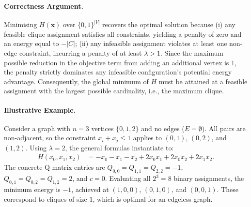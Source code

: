 \documentclass[12pt]{article}
\begin{document}
\paragraph{Correctness Argument.}
Minimising $H(\mathbf{x})$ over $\{0, 1\}^{|V|}$ recovers the optimal solution because (i) any feasible clique assignment satisfies all constraints, yielding a penalty of zero and an energy equal to $-|C|$; (ii) any infeasible assignment violates at least one non-edge constraint, incurring a penalty of at least $\lambda > 1$. Since the maximum possible reduction in the objective term from adding an additional vertex is $1$, the penalty strictly dominates any infeasible configuration's potential energy advantage. Consequently, the global minimum of $H$ must be attained at a feasible assignment with the largest possible cardinality, i.e., the maximum clique.

\paragraph{Illustrative Example.}
Consider a graph with $n = 3$ vertices $\{0, 1, 2\}$ and no edges ($E = \emptyset$). All pairs are non-adjacent, so the constraint $x_i + x_j \le 1$ applies to $(0,1)$, $(0,2)$, and $(1,2)$. Using $\lambda = 2$, the general formulas instantiate to:
\begin{align}
  H(x_0, x_1, x_2) &= -x_0 - x_1 - x_2 + 2x_0 x_1 + 2x_0 x_2 + 2x_1 x_2.
\end{align}
The concrete Q matrix entries are $Q_{0,0}=Q_{1,1}=Q_{2,2}=-1$, $Q_{0,1}=Q_{0,2}=Q_{1,2}=2$, and $c=0$. Evaluating all $2^3 = 8$ binary assignments, the minimum energy is $-1$, achieved at $(1,0,0)$, $(0,1,0)$, and $(0,0,1)$. These correspond to cliques of size $1$, which is optimal for an edgeless graph.
\end{document}
